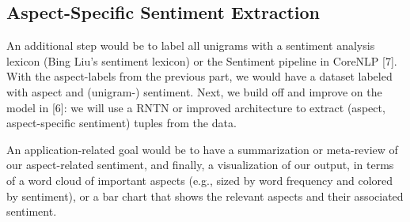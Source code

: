 \documentclass{article} %
\begin{document}
\subsection{Aspect-Specific Sentiment Extraction}

An additional step would be to label all unigrams with a sentiment analysis lexicon (Bing Liu's sentiment lexicon) or the Sentiment pipeline in CoreNLP [7]. With the aspect-labels from the previous part, we would have a dataset labeled with aspect and (unigram-) sentiment. Next, we build off and improve on the model in [6]: we will use a RNTN or improved architecture to extract (aspect, aspect-specific sentiment) tuples from the data.





An application-related goal would be to have a summarization or meta-review of our aspect-related sentiment, and finally, a visualization of our output, in terms of a word cloud of important aspects (e.g., sized by word frequency and colored by sentiment), or a bar chart that shows the relevant aspects and their associated sentiment.
\end{document}
